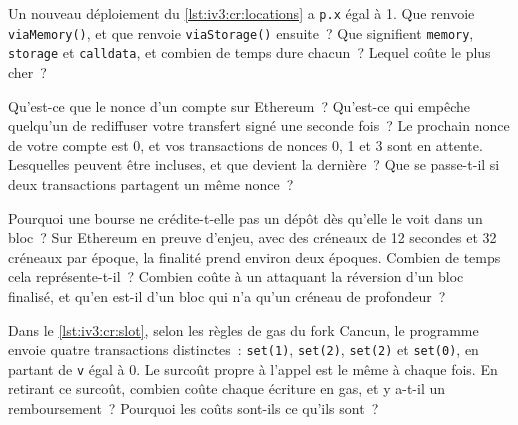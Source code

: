 \begin{question}\label{iq:iv3:smart-contracts-and-crypto-engineering:4}
Un nouveau déploiement du \cref{lst:iv3:cr:locations} a \texttt{p.x} égal à 1. Que renvoie \texttt{viaMemory()}, et que renvoie \texttt{viaStorage()} ensuite~? Que signifient \texttt{memory}, \texttt{storage} et \texttt{calldata}, et combien de temps dure chacun~? Lequel coûte le plus cher~?
\label{lst:iv3:cr:locations}
\end{question}

\begin{question}\label{iq:iv3:smart-contracts-and-crypto-engineering:5}
Qu'est-ce que le nonce d'un compte sur Ethereum~? Qu'est-ce qui empêche quelqu'un de rediffuser votre transfert signé une seconde fois~? Le prochain nonce de votre compte est 0, et vos transactions de nonces 0, 1 et 3 sont en attente. Lesquelles peuvent être incluses, et que devient la dernière~? Que se passe-t-il si deux transactions partagent un même nonce~?
\end{question}

\begin{question}\label{iq:iv3:smart-contracts-and-crypto-engineering:6}
Pourquoi une bourse ne crédite-t-elle pas un dépôt dès qu'elle le voit dans un bloc~? Sur Ethereum en preuve d'enjeu, avec des créneaux de 12 secondes et 32 créneaux par époque, la finalité prend environ deux époques. Combien de temps cela représente-t-il~? Combien coûte à un attaquant la réversion d'un bloc finalisé, et qu'en est-il d'un bloc qui n'a qu'un créneau de profondeur~?
\end{question}

\begin{question}\label{iq:iv3:smart-contracts-and-crypto-engineering:7}
Dans le \cref{lst:iv3:cr:slot}, selon les règles de gas du fork Cancun, le programme envoie quatre transactions distinctes~: \texttt{set(1)}, \texttt{set(2)}, \texttt{set(2)} et \texttt{set(0)}, en partant de \texttt{v} égal à 0. Le surcoût propre à l'appel est le même à chaque fois. En retirant ce surcoût, combien coûte chaque écriture en gas, et y a-t-il un remboursement~? Pourquoi les coûts sont-ils ce qu'ils sont~?
\label{lst:iv3:cr:slot}
\end{question}

